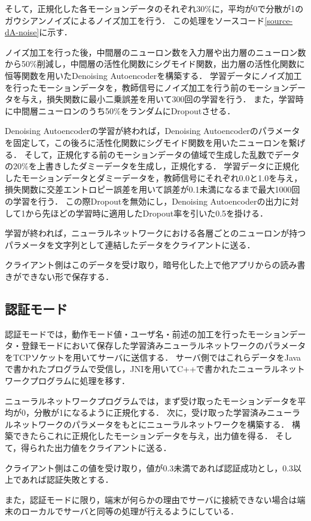 

そして，正規化した各モーションデータのそれぞれ30\%に，平均が0で分散が1のガウシアンノイズによるノイズ加工を行う．
この処理をソースコード\ref{source-dA-noise}に示す．



ノイズ加工を行った後，中間層のニューロン数を入力層や出力層のニューロン数から50\%削減し，中間層の活性化関数にシグモイド関数，出力層の活性化関数に恒等関数を用いたDenoising Autoencoderを構築する．
学習データにノイズ加工を行ったモーションデータを，教師信号にノイズ加工を行う前のモーションデータを与え，損失関数に最小二乗誤差を用いて300回の学習を行う．
また，学習時に中間層ニューロンのうち50\%をランダムにDropoutさせる．

Denoising Autoencoderの学習が終われば，Denoising Autoencoderのパラメータを固定して，この後ろに活性化関数にシグモイド関数を用いたニューロンを繋げる．
そして，正規化する前のモーションデータの値域で生成した乱数でデータの20\%を上書きしたダミーデータを生成し，正規化する．
学習データに正規化したモーションデータとダミーデータを，教師信号にそれぞれ0.0と1.0を与え，損失関数に交差エントロピー誤差を用いて誤差が0.1未満になるまで最大1000回の学習を行う．
この際Dropoutを無効にし，Denoising Autoencoderの出力に対して1から先ほどの学習時に適用したDropout率を引いた0.5を掛ける．

学習が終われば，ニューラルネットワークにおける各層ごとのニューロンが持つパラメータを文字列として連結したデータをクライアントに送る．

クライアント側はこのデータを受け取り，暗号化した上で他アプリからの読み書きができない形で保存する．

\subsection{認証モード}
認証モードでは，動作モード値・ユーザ名・前述の加工を行ったモーションデータ・登録モードにおいて保存した学習済みニューラルネットワークのパラメータをTCPソケットを用いてサーバに送信する．
サーバ側ではこれらデータをJavaで書かれたプログラムで受信し，JNIを用いてC++で書かれたニューラルネットワークプログラムに処理を移す．

ニューラルネットワークプログラムでは，まず受け取ったモーションデータを平均が0，分散が1になるように正規化する．
次に，受け取った学習済みニューラルネットワークのパラメータをもとにニューラルネットワークを構築する．
構築できたらこれに正規化したモーションデータを与え，出力値を得る．
そして，得られた出力値をクライアントに送る．

クライアント側はこの値を受け取り，値が0.3未満であれば認証成功とし，0.3以上であれば認証失敗とする．

また，認証モードに限り，端末が何らかの理由でサーバに接続できない場合は端末のローカルでサーバと同等の処理が行えるようにしている．

